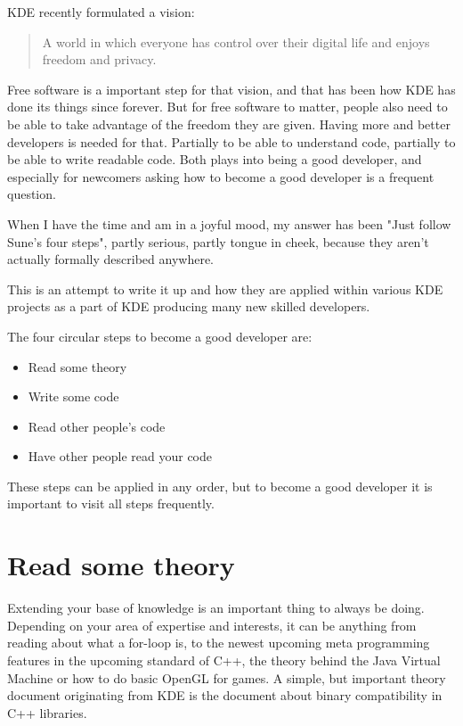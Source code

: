 

\noindent{}
KDE recently formulated a vision:
\begin{quote}
A world in which everyone has control over their digital life and enjoys freedom and privacy.
\end{quote}

Free software is a important step for that vision, and that has been how KDE has done its things since forever. But for free software to matter, people also need to be able to take advantage of the freedom they are given. Having more and better developers is needed for that. Partially to be able to understand code, partially to be able to write readable code. Both plays into being a good developer, and especially for newcomers asking how to become a good developer is a frequent question.

When I have the time and am in a joyful mood, my answer has been "Just follow Sune's four steps", partly serious, partly tongue in cheek, because they aren't actually formally described anywhere.

This is an attempt to write it up and how they are applied within various KDE projects as a part of KDE producing many new skilled developers.

The four circular steps to become a good developer are:
\begin{itemize}
 \item Read some theory
 \item Write some code
 \item Read other people's code
 \item Have other people read your code
\end{itemize}

These steps can be applied in any order, but to become a good developer it is important to visit all steps frequently.

\section*{Read some theory}
Extending your base of knowledge is an important thing to always be doing. Depending on your area of expertise and interests, it can be anything from reading about what a for-loop is, to the newest upcoming meta programming features in the upcoming standard of C++, the theory behind the Java Virtual Machine or how to do basic OpenGL for games. A simple, but important theory document originating from KDE is the document about binary compatibility in C++ libraries.

